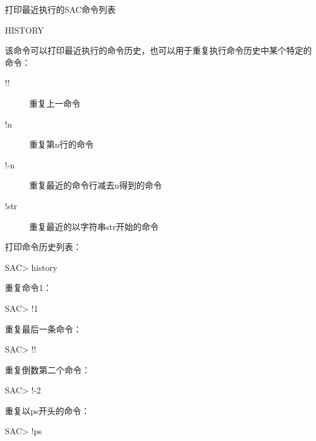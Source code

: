 \label{cmd:history}

打印最近执行的SAC命令列表

\begin{SACSTX}
HISTORY
\end{SACSTX}

该命令可以打印最近执行的命令历史，也可以用于重复执行命令历史中某个特定的命令：
\begin{description}
\item [!!] 重复上一命令
\item [!n] 重复第n行的命令
\item [!-n] 重复最近的命令行减去n得到的命令
\item [!str] 重复最近的以字符串str开始的命令
\end{description}

打印命令历史列表：
\begin{SACCode}
SAC> history
\end{SACCode}

重复命令1：
\begin{SACCode}
SAC> !1
\end{SACCode}

重复最后一条命令：
\begin{SACCode}
SAC> !!
\end{SACCode}

重复倒数第二个命令：
\begin{SACCode}
SAC> !-2
\end{SACCode}

重复以ps开头的命令：
\begin{SACCode}
SAC> !ps
\end{SACCode}
